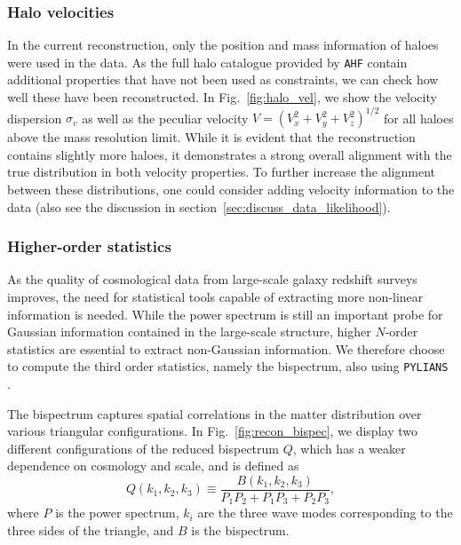 \subsubsection{Halo velocities}
In the current reconstruction, only the position and mass information of haloes were used in the data. As the full halo catalogue provided by \texttt{AHF} contain additional properties that have not been used as constraints, we can check how well these have been reconstructed. In Fig.~\ref{fig:halo_vel}, we show the velocity dispersion $\sigma_v$ as well as the peculiar velocity $V=(V_x^2+V_y^2+V_z^2)^{1/2}$ for all haloes above the mass resolution limit. While it is evident that the reconstruction contains slightly more haloes, it demonstrates a strong overall alignment with the true distribution in both velocity properties. To further increase the alignment between these distributions, one could consider adding velocity information to the data (also see the discussion in section~\ref{sec:discuss_data_likelihood}). 

\subsubsection{Higher-order statistics}
\label{sec:higher}
As the quality of cosmological data from large-scale galaxy redshift surveys improves, the need for statistical tools capable of extracting more non-linear information is needed. While the power spectrum is still an important probe for Gaussian information contained in the large-scale structure, higher $N$-order statistics are essential to extract non-Gaussian information. We therefore choose to compute the third order statistics, namely the bispectrum, also using \texttt{PYLIANS} \citep{Pylians}. 

The bispectrum captures spatial correlations in the matter distribution over various triangular configurations. In Fig.~\ref{fig:recon_bispec}, we display two different configurations of the reduced bispectrum $Q$, which has a weaker dependence on cosmology and scale, and is defined as
\begin{equation}
    Q\left(k_1, k_2, k_3\right) \equiv \frac{B\left(k_1, k_2, k_3\right)}{P_1 P_2+P_1 P_3+P_2 P_3},
\end{equation}
where $P$ is the power spectrum, $k_i$ are the three wave modes corresponding to the three sides of the triangle, and $B$ is the bispectrum. 

